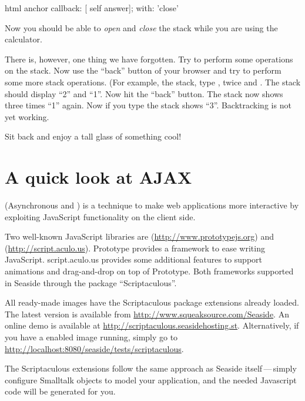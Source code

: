 \documentclass[a4paper,10pt,twoside]{book}
\begin{document}
\begin{code}{}
html anchor
	callback: [ self answer];
	with: 'close'
\end{code}


Now you should be able to \emph{open} and \emph{close} the stack while you are using the calculator.

There is, however, one thing we have forgotten.
Try to perform some operations on the stack.
Now use the ``back'' button of your browser and try to perform some more stack operations.
(For example,  the stack, type ,  twice and \menu {+}.
The stack should display ``2'' and ``1''.
Now hit the ``back'' button.
The stack now shows three times ``1'' again.
Now if you type \menu{+} the stack shows ``3''.
Backtracking is not yet working.


Sit back and enjoy a tall glass of something cool!

\section{A quick look at AJAX}


 (Asynchronous  and ) is a technique to make web applications more interactive by exploiting JavaScript functionality on the client side.

Two well-known JavaScript libraries are  (\url{http://www.prototypejs.org}) and  (\url{http://script.aculo.us}).
Prototype provides a framework to ease writing JavaScript.
script.aculo.us provides some additional features to support animations and drag-and-drop on top of Prototype.
Both frameworks supported in Seaside through the package ``Scriptaculous''.

All ready-made images have the Scriptaculous package extensions already loaded.
The latest version is available from \url{http://www.squeaksource.com/Seaside}.
An online demo is available at \url{http://scriptaculous.seasidehosting.st}.
Alternatively, if you have a enabled image running, simply go to \url{http://localhost:8080/seaside/tests/scriptaculous}.

The Scriptaculous extensions follow the same approach as Seaside itself\,---\,simply configure Smalltalk objects to model your application, and the needed Javascript code will be generated for you.
\end{document}
